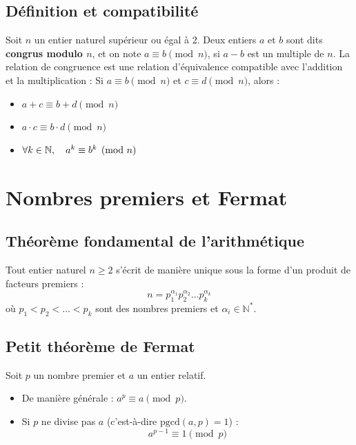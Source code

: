 \documentclass{article}
\begin{document}
	\subsection{Définition et compatibilité}
	Soit $n$ un entier naturel supérieur ou égal à 2. Deux entiers $a$ et $b$ sont dits \textbf{congrus modulo $n$}, et on note $a \equiv b \pmod n$, si $a - b$ est un multiple de $n$.
	La relation de congruence est une relation d'équivalence compatible avec l'addition et la multiplication :
	Si $a \equiv b \pmod n$ et $c \equiv d \pmod n$, alors :
	\begin{itemize}
		\item $a + c \equiv b + d \pmod n$
		\item $a \cdot c \equiv b \cdot d \pmod n$
		\item $\qcq{k}{N}, \quad a^k \equiv b^k \pmod n$
	\end{itemize}
	
	\section{Nombres premiers et Fermat}
	
	\subsection{Théorème fondamental de l'arithmétique}
	Tout entier naturel $n \ge 2$ s'écrit de manière unique sous la forme d'un produit de facteurs premiers :
	\[ n = p_1^{\alpha_1} p_2^{\alpha_2} \dots p_k^{\alpha_k} \]
	où $p_1 < p_2 < \dots < p_k$ sont des nombres premiers et $\alpha_i \in \mathbb{N}^*$.
	
	\subsection{Petit théorème de Fermat}
	Soit $p$ un nombre premier et $a$ un entier relatif.
	\begin{itemize}
		\item De manière générale : $a^p \equiv a \pmod p$.
		\item Si $p$ ne divise pas $a$ (c'est-à-dire $\text{pgcd}(a, p) = 1$) :
		\[ a^{p-1} \equiv 1 \pmod p \]
	\end{itemize}
	
\end{document}
